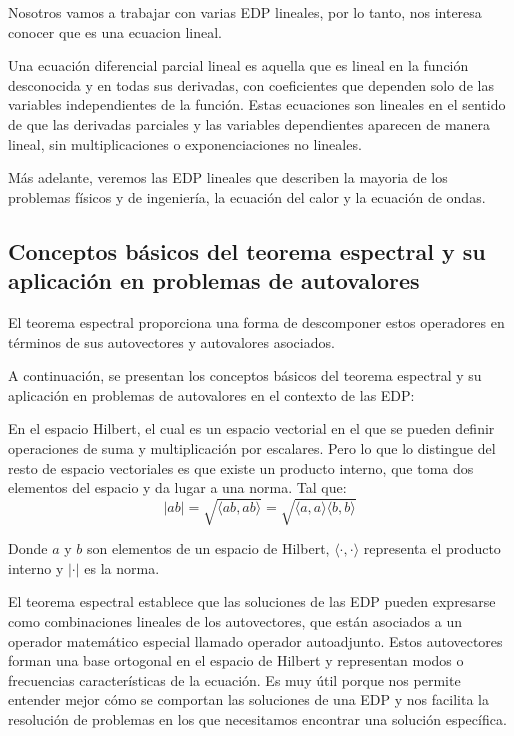 \documentclass{article}
\begin{document}
    Nosotros vamos a trabajar con varias EDP lineales, por lo tanto, nos interesa conocer que es una ecuacion lineal.
    
    Una ecuación diferencial parcial lineal es aquella que es lineal en la función desconocida y en todas sus derivadas, con coeficientes que dependen solo de las variables independientes de la función. Estas ecuaciones son lineales en el sentido de que las derivadas parciales y las variables dependientes aparecen de manera lineal, sin multiplicaciones o exponenciaciones no lineales. 

    Más adelante, veremos las EDP lineales que describen la mayoria de los problemas físicos y de ingeniería, la ecuación del calor y la ecuación de ondas.
    \subsection{Conceptos básicos del teorema espectral y su aplicación en problemas de autovalores}

    El teorema espectral proporciona una forma de descomponer estos operadores en términos de sus autovectores y autovalores asociados.

    A continuación, se presentan los conceptos básicos del teorema espectral y su aplicación en problemas de autovalores en el contexto de las EDP:

    En el espacio Hilbert, el cual es un espacio vectorial en el que se pueden definir operaciones de suma y multiplicación por escalares. Pero lo que lo distingue del resto de espacio vectoriales es que existe un producto interno, que toma dos elementos del espacio y da lugar a una norma. Tal que:
    \begin{equation}
        |ab| = \sqrt{\langle ab, ab \rangle} = \sqrt{\langle a,a \rangle \langle b,b \rangle}
        \end{equation}
        
        Donde $a$ y $b$ son elementos de un espacio de Hilbert, $\langle \cdot, \cdot \rangle$ representa el producto interno y $| \cdot |$ es la norma.
    

    El teorema espectral establece que las soluciones de las EDP pueden expresarse como combinaciones lineales de los autovectores, que están asociados a un operador matemático especial llamado operador autoadjunto. Estos autovectores forman una base ortogonal en el espacio de Hilbert y representan modos o frecuencias características de la ecuación. Es muy útil porque nos permite entender mejor cómo se comportan las soluciones de una EDP y nos facilita la resolución de problemas en los que necesitamos encontrar una solución específica.
\end{document}
